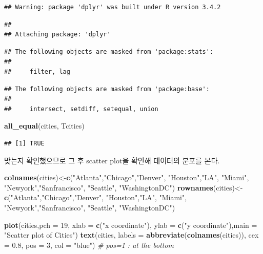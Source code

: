 \documentclass[]{article}
\newenvironment{Shaded}{\begin{snugshade}}{\end{snugshade}}
\newcommand{\KeywordTok}[1]{\textcolor[rgb]{0.13,0.29,0.53}{\textbf{{#1}}}}
\newcommand{\DataTypeTok}[1]{\textcolor[rgb]{0.13,0.29,0.53}{{#1}}}
\newcommand{\DecValTok}[1]{\textcolor[rgb]{0.00,0.00,0.81}{{#1}}}
\newcommand{\FloatTok}[1]{\textcolor[rgb]{0.00,0.00,0.81}{{#1}}}
\newcommand{\StringTok}[1]{\textcolor[rgb]{0.31,0.60,0.02}{{#1}}}
\newcommand{\CommentTok}[1]{\textcolor[rgb]{0.56,0.35,0.01}{\textit{{#1}}}}
\newcommand{\NormalTok}[1]{{#1}}
\begin{document}
\begin{verbatim}
## Warning: package 'dplyr' was built under R version 3.4.2
\end{verbatim}

\begin{verbatim}
## 
## Attaching package: 'dplyr'
\end{verbatim}

\begin{verbatim}
## The following objects are masked from 'package:stats':
## 
##     filter, lag
\end{verbatim}

\begin{verbatim}
## The following objects are masked from 'package:base':
## 
##     intersect, setdiff, setequal, union
\end{verbatim}

\begin{Shaded}
\begin{Highlighting}[]
\KeywordTok{all_equal}\NormalTok{(cities, Tcities)}
\end{Highlighting}
\end{Shaded}

\begin{verbatim}
## [1] TRUE
\end{verbatim}

맞는지 확인했으므로 그 후 scatter plot을 확인해 데이터의 분포를 본다.

\begin{Shaded}
\begin{Highlighting}[]
\KeywordTok{colnames}\NormalTok{(cities)<-}\KeywordTok{c}\NormalTok{(}\StringTok{"Atlanta"}\NormalTok{,}\StringTok{"Chicago"}\NormalTok{,}\StringTok{"Denver"}\NormalTok{, }\StringTok{"Houston"}\NormalTok{,}\StringTok{"LA"}\NormalTok{, }\StringTok{"Miami"}\NormalTok{, }\StringTok{"Newyork"}\NormalTok{,}\StringTok{"Sanfrancisco"}\NormalTok{, }\StringTok{"Seattle"}\NormalTok{, }\StringTok{"WashingtonDC"}\NormalTok{)}
\KeywordTok{rownames}\NormalTok{(cities)<-}\KeywordTok{c}\NormalTok{(}\StringTok{"Atlanta"}\NormalTok{,}\StringTok{"Chicago"}\NormalTok{,}\StringTok{"Denver"}\NormalTok{, }\StringTok{"Houston"}\NormalTok{,}\StringTok{"LA"}\NormalTok{, }\StringTok{"Miami"}\NormalTok{, }\StringTok{"Newyork"}\NormalTok{,}\StringTok{"Sanfrancisco"}\NormalTok{, }\StringTok{"Seattle"}\NormalTok{, }\StringTok{"WashingtonDC"}\NormalTok{)}

\KeywordTok{plot}\NormalTok{(cities,}\DataTypeTok{pch =} \DecValTok{19}\NormalTok{, }\DataTypeTok{xlab =} \KeywordTok{c}\NormalTok{(}\StringTok{"x coordinate"}\NormalTok{), }\DataTypeTok{ylab =} \KeywordTok{c}\NormalTok{(}\StringTok{"y coordinate"}\NormalTok{),}\DataTypeTok{main =} \StringTok{"Scatter plot of Cities"}\NormalTok{)}
\KeywordTok{text}\NormalTok{(cities, }\DataTypeTok{labels =} \KeywordTok{abbreviate}\NormalTok{(}\KeywordTok{colnames}\NormalTok{(cities)), }\DataTypeTok{cex =} \FloatTok{0.8}\NormalTok{, }\DataTypeTok{pos =} \DecValTok{3}\NormalTok{, }\DataTypeTok{col =} \StringTok{"blue"}\NormalTok{) }\CommentTok{# pos=1 : at the bottom}
\end{Highlighting}
\end{Shaded}
\end{document}
